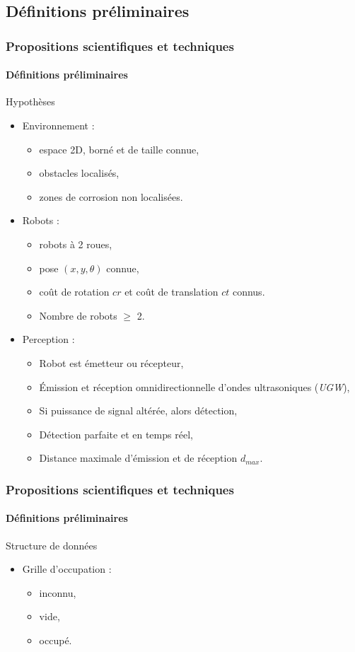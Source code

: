 \documentclass{beamer}
\begin{document}
		\subsection{Définitions préliminaires}
			\begin{frame}[shrink=5]
				\frametitle{Propositions scientifiques et techniques}
				\framesubtitle{Définitions préliminaires}
				\begin{block}{Hypothèses}
					\begin{itemize}
						\item Environnement :
						\begin{itemize}
							\item espace 2D, borné et de taille connue,
							\item obstacles localisés,
							\item zones de corrosion non localisées.
						\end{itemize}
						\item Robots :
						\begin{itemize}
							\item robots à 2 roues,
							\item pose $(x, y, \theta)$ connue,
							\item coût de rotation $cr$ et coût de translation $ct$ connus.
							\item Nombre de robots $\ge$ 2.
						\end{itemize}
						\item Perception :
						\begin{itemize}
							\item Robot est émetteur ou récepteur,
							\item Émission et réception omnidirectionnelle d'ondes ultrasoniques (\textit{UGW}),
							\item Si puissance de signal altérée, alors détection,
							\item Détection parfaite et en temps réel,
							\item Distance maximale d'émission et de réception $d_{max}$.
						\end{itemize}
					\end{itemize}
				\end{block}
			\end{frame}
			\begin{frame}
				\frametitle{Propositions scientifiques et techniques}
				\framesubtitle{Définitions préliminaires}
				\begin{block}{Structure de données}
					\begin{itemize}
						\item Grille d'occupation :
						\begin{itemize}
							\item inconnu,
							\item vide,
							\item occupé.
						\end{itemize}
					\end{itemize}
				\end{block}
			\end{frame}
\end{document}
